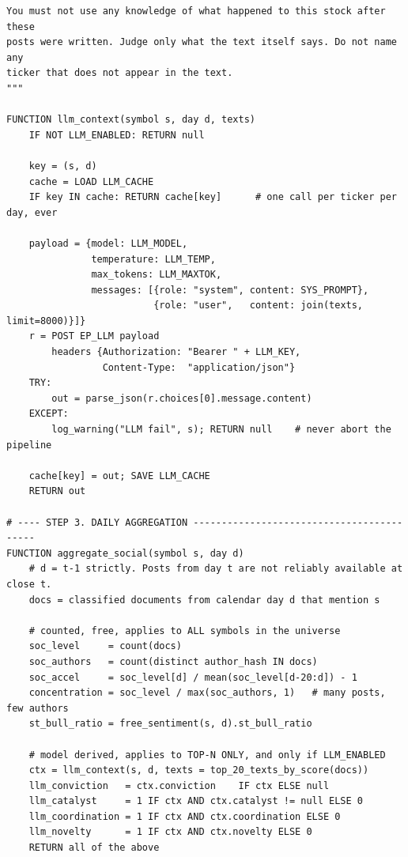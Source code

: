\documentclass[10pt]{article}
\begin{document}
\begin{lstlisting}
You must not use any knowledge of what happened to this stock after these
posts were written. Judge only what the text itself says. Do not name any
ticker that does not appear in the text.
"""

FUNCTION llm_context(symbol s, day d, texts)
    IF NOT LLM_ENABLED: RETURN null

    key = (s, d)
    cache = LOAD LLM_CACHE
    IF key IN cache: RETURN cache[key]      # one call per ticker per day, ever

    payload = {model: LLM_MODEL,
               temperature: LLM_TEMP,
               max_tokens: LLM_MAXTOK,
               messages: [{role: "system", content: SYS_PROMPT},
                          {role: "user",   content: join(texts, limit=8000)}]}
    r = POST EP_LLM payload
        headers {Authorization: "Bearer " + LLM_KEY,
                 Content-Type:  "application/json"}
    TRY:
        out = parse_json(r.choices[0].message.content)
    EXCEPT:
        log_warning("LLM fail", s); RETURN null    # never abort the pipeline

    cache[key] = out; SAVE LLM_CACHE
    RETURN out

# ---- STEP 3. DAILY AGGREGATION ------------------------------------------
FUNCTION aggregate_social(symbol s, day d)
    # d = t-1 strictly. Posts from day t are not reliably available at close t.
    docs = classified documents from calendar day d that mention s

    # counted, free, applies to ALL symbols in the universe
    soc_level     = count(docs)
    soc_authors   = count(distinct author_hash IN docs)
    soc_accel     = soc_level[d] / mean(soc_level[d-20:d]) - 1
    concentration = soc_level / max(soc_authors, 1)   # many posts, few authors
    st_bull_ratio = free_sentiment(s, d).st_bull_ratio

    # model derived, applies to TOP-N ONLY, and only if LLM_ENABLED
    ctx = llm_context(s, d, texts = top_20_texts_by_score(docs))
    llm_conviction   = ctx.conviction    IF ctx ELSE null
    llm_catalyst     = 1 IF ctx AND ctx.catalyst != null ELSE 0
    llm_coordination = 1 IF ctx AND ctx.coordination ELSE 0
    llm_novelty      = 1 IF ctx AND ctx.novelty ELSE 0
    RETURN all of the above


\end{lstlisting}
\end{document}
